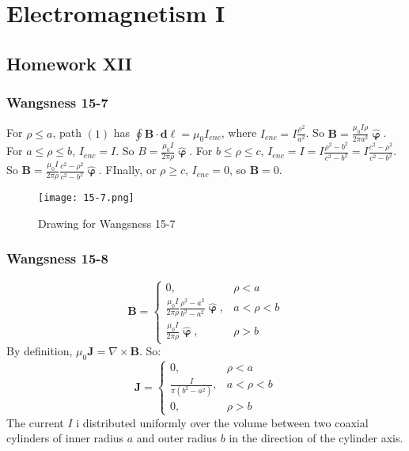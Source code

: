 \documentclass[crop=false,class=article,oneside]{standalone}
\begin{document}
    \ifx\ifemagi\undefined
        \section*{Electromagnetism I}
        \setcounter{section}{12}
        \renewcommand\thesubfigure{%
            \arabic{section}.\arabic{figure}.\arabic{subfigure}%
        }
    \fi 
    \subsection{Homework XII}
        \subsubsection{Wangsness 15-7}
        For $\rho\leq a$, path $(1)$ has $\oint \mathbf{B}\cdot \mathbf{d\ell}= \mu_0 I_{enc}$, where $I_{enc} = I\frac{\rho^2}{a^2}$. So $\mathbf{B} = \frac{\mu_0 I\rho}{2\pi a^2} \hat{\boldsymbol{\upvarphi}}$. For $a\leq \rho \leq b$, $I_{enc} = I$. So $B = \frac{\mu_0 I}{2\pi \rho} \hat{\boldsymbol{\upvarphi}}$. For $b\leq \rho \leq c$, $I_{enc} = I =I\frac{\rho^2-b^2}{c^2-b^2} = I\frac{c^2-\rho^2}{c^2-b^2}$. So $\mathbf{B} = \frac{\mu_0 I}{2\pi \rho} \frac{c^2-\rho^2}{c^2-b^2}\hat{\boldsymbol{\upvarphi}}$. FInally, or $\rho \geq c$, $I_{enc} = 0$, so $\mathbf{B} = 0$.
        \begin{figure}[htbp]
            \centering
            {\texttt{[image: 15-7.png]}}
            \caption{Drawing for Wangsness 15-7}
        \end{figure}
        \subsubsection{Wangsness 15-8}
        \begin{equation*}
            \mathbf{B} = \begin{cases} 0, & \rho < a \\ \frac{\mu_0 I}{2\pi \rho}\frac{\rho^2-a^2}{b^2-a^2}\hat{\boldsymbol{\upvarphi}}, & a<\rho < b \\ \frac{\mu_0 I}{2\pi \rho} \hat{\boldsymbol{\upvarphi}}, & \rho>b\end{cases}    
        \end{equation*}
        By definition, $\mu_0 \mathbf{J} = \nabla \times \mathbf{B}$. So:
        \begin{equation*}
            \mathbf{J} = \begin{cases} 0, & \rho<a\\ \frac{I}{\pi(b^2-a^2)}, & a<\rho < b\\ 0, & \rho>b \end{cases}    
        \end{equation*}
        The current $I$ i distributed uniformly over the volume between two coaxial cylinders of inner radius $a$ and outer radius $b$ in the direction of the cylinder axis.
\end{document}
